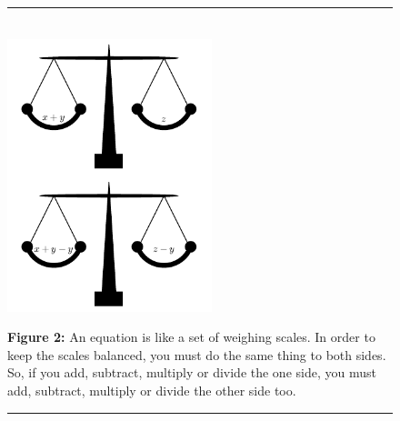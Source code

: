 	\begin{figure}[H] %
    \begin{center}
    \rule[.1in]{\figurerulewidth}{.005in} \\
        \label{m38346*uid37!!!underscore!!!media}\label{m38346*uid37!!!underscore!!!printimage}\includegraphics[height=300px]{col11306.imgs/m38346_MG10C2_002.png} %
      \vspace{2pt}
    \vspace{\rubberspace}\par \begin{cnxcaption}
	  \small \textbf{Figure 2: }An equation is like a set of weighing scales. In order to keep the
scales balanced, you must do the same thing to both sides. So, if you add,
subtract, multiply or divide the one side, you must add, subtract, multiply or
divide the other side too.
	\end{cnxcaption}
    \vspace{.1in}
    \rule[.1in]{\figurerulewidth}{.005in} \\
    \end{center}
 \end{figure}       
      \label{m38346*uid38}
